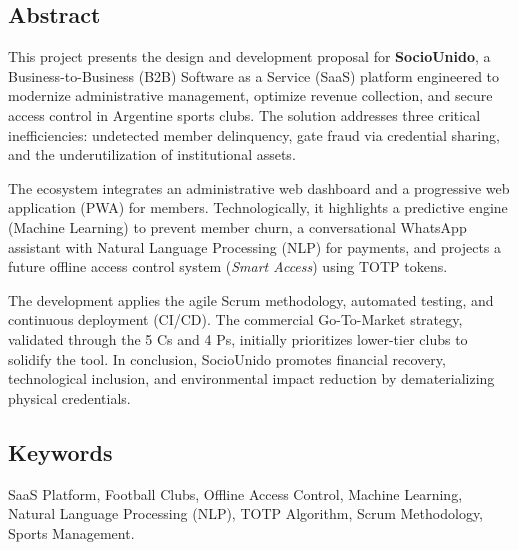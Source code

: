 \subsection{Abstract}

This project presents the design and development proposal for \textbf{SocioUnido}, a Business-to-Business (B2B) Software as a Service (SaaS) platform engineered to modernize administrative management, optimize revenue collection, and secure access control in Argentine sports clubs. The solution addresses three critical inefficiencies: undetected member delinquency, gate fraud via credential sharing, and the underutilization of institutional assets.

The ecosystem integrates an administrative web dashboard and a progressive web application (PWA) for members. Technologically, it highlights a predictive engine (Machine Learning) to prevent member churn, a conversational WhatsApp assistant with Natural Language Processing (NLP) for payments, and projects a future offline access control system (\textit{Smart Access}) using TOTP tokens.

The development applies the agile Scrum methodology, automated testing, and continuous deployment (CI/CD). The commercial Go-To-Market strategy, validated through the 5 Cs and 4 Ps, initially prioritizes lower-tier clubs to solidify the tool. In conclusion, SocioUnido promotes financial recovery, technological inclusion, and environmental impact reduction by dematerializing physical credentials.

\subsection{Keywords}

SaaS Platform, Football Clubs, Offline Access Control, Machine Learning, Natural Language Processing (NLP), TOTP Algorithm, Scrum Methodology, Sports Management.

